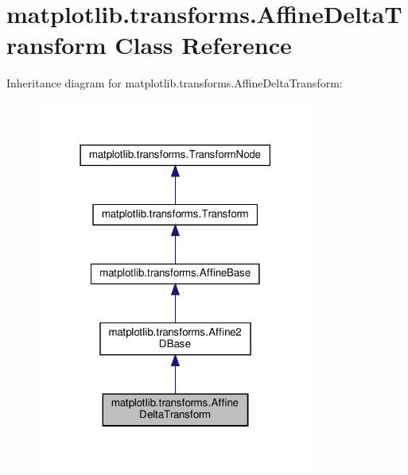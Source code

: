 \hypertarget{classmatplotlib_1_1transforms_1_1AffineDeltaTransform}{}\section{matplotlib.\+transforms.\+Affine\+Delta\+Transform Class Reference}
\label{classmatplotlib_1_1transforms_1_1AffineDeltaTransform}


Inheritance diagram for matplotlib.\+transforms.\+Affine\+Delta\+Transform\+:
\nopagebreak
\begin{figure}[H]
\begin{center}
\leavevmode
\includegraphics[width=259pt]{classmatplotlib_1_1transforms_1_1AffineDeltaTransform__inherit__graph}
\end{center}
\end{figure}



